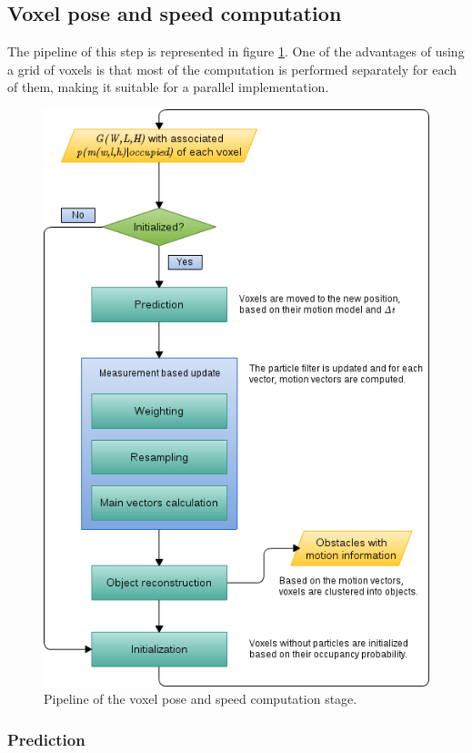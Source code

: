 \subsection{Voxel pose and speed computation}\label{ch:chapter05_01_04}

The pipeline of this step is represented in figure \ref{fig:cp05_voxel_pose_speed_computation}. One of the advantages of using a grid of voxels is that most of the computation is performed separately for each of them, making it suitable for a parallel implementation. 

\begin{figure}[h!]
  \centering
  \includegraphics[width=\textwidth, height=\textwidth]{voxelPoseAndSpeedComputation}
  \caption{Pipeline of the voxel pose and speed computation stage.}\label{fig:cp05_voxel_pose_speed_computation}
\end{figure}

\subsubsection{Prediction}\label{ch:chapter05_01_04_01}

